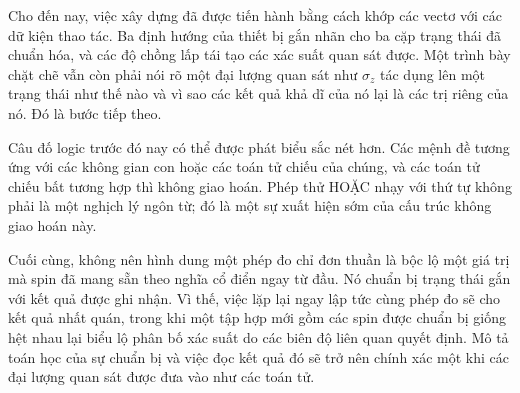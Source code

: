Cho đến nay, việc xây dựng đã được tiến hành bằng cách khớp các vectơ với các dữ kiện thao tác. Ba định hướng của thiết bị gắn nhãn cho ba cặp trạng thái đã chuẩn hóa, và các độ chồng lấp tái tạo các xác suất quan sát được. Một trình bày chặt chẽ vẫn còn phải nói rõ một đại lượng quan sát như \(\sigma_z\) tác dụng lên một trạng thái như thế nào và vì sao các kết quả khả dĩ của nó lại là các trị riêng của nó. Đó là bước tiếp theo.

Câu đố logic trước đó nay có thể được phát biểu sắc nét hơn. Các mệnh đề tương ứng với các không gian con hoặc các toán tử chiếu của chúng, và các toán tử chiếu bất tương hợp thì không giao hoán. Phép thử HOẶC nhạy với thứ tự không phải là một nghịch lý ngôn từ; đó là một sự xuất hiện sớm của cấu trúc không giao hoán này.

\begin{classroomqa}
\end{classroomqa}

\begin{classroomqa}
\end{classroomqa}

Cuối cùng, không nên hình dung một phép đo chỉ đơn thuần là bộc lộ một giá trị mà spin đã mang sẵn theo nghĩa cổ điển ngay từ đầu. Nó chuẩn bị trạng thái gắn với kết quả được ghi nhận. Vì thế, việc lặp lại ngay lập tức cùng phép đo sẽ cho kết quả nhất quán, trong khi một tập hợp mới gồm các spin được chuẩn bị giống hệt nhau lại biểu lộ phân bố xác suất do các biên độ liên quan quyết định. Mô tả toán học của sự chuẩn bị và việc đọc kết quả đó sẽ trở nên chính xác một khi các đại lượng quan sát được đưa vào như các toán tử.

